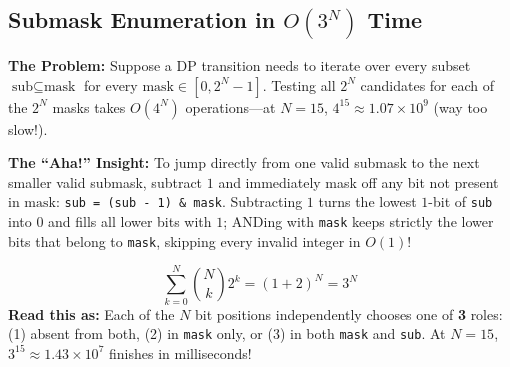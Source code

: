 \documentclass[11pt,a4paper]{article}
\theoremstyle{definition}
\newcommand{\painbeat}{\textbf{\color{accentamber}The Problem:} }
\newcommand{\ahabeat}{\textbf{\color{accentteal}The ``Aha!'' Insight:} }
\begin{document}
\subsection{Submask Enumeration in \texorpdfstring{$O(3^N)$}{O(3\textasciicircum N)} Time}

\painbeat Suppose a DP transition needs to iterate over every subset $\text{sub} \subseteq \text{mask}$ for every $\text{mask} \in [0, 2^N - 1]$. Testing all $2^N$ candidates for each of the $2^N$ masks takes $O(4^N)$ operations---at $N = 15$, $4^{15} \approx 1.07 \times 10^9$ (way too slow!).

\ahabeat To jump directly from one valid submask to the next smaller valid submask, subtract $1$ and immediately mask off any bit not present in $\text{mask}$: \texttt{sub = (sub - 1) \& mask}. Subtracting $1$ turns the lowest $1$-bit of \texttt{sub} into $0$ and fills all lower bits with $1$; ANDing with \texttt{mask} keeps strictly the lower bits that belong to \texttt{mask}, skipping every invalid integer in $O(1)$!

\begin{formulabox}
$$\sum_{k=0}^{N} \binom{N}{k} 2^k = (1 + 2)^N = 3^N$$
\textbf{Read this as:} Each of the $N$ bit positions independently chooses one of \textbf{3} roles: (1) absent from both, (2) in \texttt{mask} only, or (3) in both \texttt{mask} and \texttt{sub}. At $N = 15$, $3^{15} \approx 1.43 \times 10^7$ finishes in milliseconds!
\end{formulabox}
\end{document}
